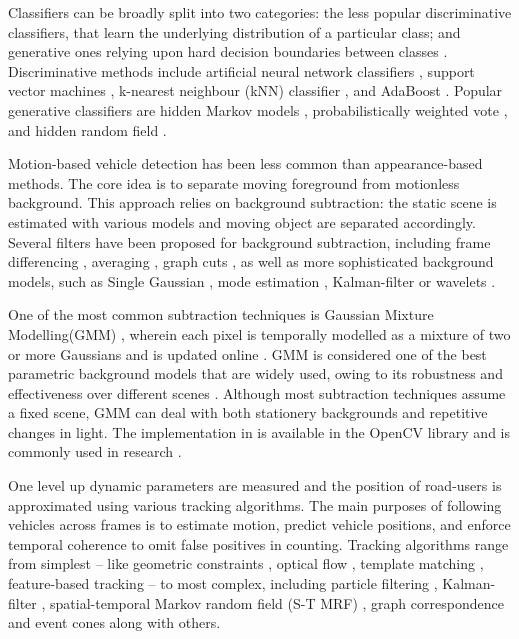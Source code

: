 Classifiers can be broadly split into two categories: the less popular discriminative classifiers, that learn the underlying distribution of a particular class; and generative ones relying upon hard decision boundaries between classes \cite{Sivaraman2012}.
Discriminative methods include artificial neural network classifiers \cite{Xia2006}, support vector machines \cite{Cornelis2008}, k-nearest neighbour (kNN) classifier \cite{Morris2006}, and AdaBoost \cite{Khammari2005}.
Popular generative classifiers are hidden Markov models \cite{Jazayeri2011}, probabilistically weighted vote \cite{Lin2012}, and hidden random field \cite{Zhang2011}.

Motion-based vehicle detection has been less common than appearance-based methods.
The core idea is to separate moving foreground from motionless background.
This approach relies on background subtraction: the static scene is estimated with various models and moving object are separated accordingly.
Several filters have been proposed for background subtraction, including frame differencing \cite{Park2007}, averaging \cite{Kanhere2008}, graph cuts \cite{Woodford2009}, as well as more sophisticated background models, such as Single Gaussian \cite{Kumar2003}, mode estimation \cite{Zheng2006}, Kalman-filter \cite{Messelodi2005} or wavelets \cite{Gao2009}. 

One of the most common subtraction techniques is Gaussian Mixture Modelling(GMM) \cite{Niknejad2012, Wang2009,Zhang2016a}, wherein each pixel is temporally modelled as a mixture of two or more Gaussians and is updated online \cite{Stauffer1999,Stauffer2000}.
GMM is considered one of the best parametric background models that are widely used, owing to its robustness and effectiveness over different scenes \cite{Zhang2016}.
Although most subtraction techniques assume a fixed scene, GMM can deal with both stationery backgrounds and repetitive changes in light.
The implementation in \cite{Kaewtrakulpong2001} is available in the OpenCV library and is commonly used in research \cite{OpenCVMog2}.

One level up dynamic parameters are measured and the position of road-users is approximated using various tracking algorithms. 
The main purposes of following vehicles across frames is to estimate  motion, predict vehicle positions, and enforce temporal coherence to omit false positives in counting.
Tracking algorithms range from simplest -- like geometric constraints \cite{Rabe2007}, optical flow \cite{Bhaskar2015}, template matching \cite{Liu2007}, feature-based tracking \cite{Haselhoff2009} -- to most complex, including particle filtering \cite{Danescu2011}, Kalman-filter \cite{Bresson2015}, spatial-temporal Markov random field (S-T MRF) \cite{Zhu2005}, graph correspondence \cite{Lai2010} and event cones \cite{Andrienko2015} along with others. 

